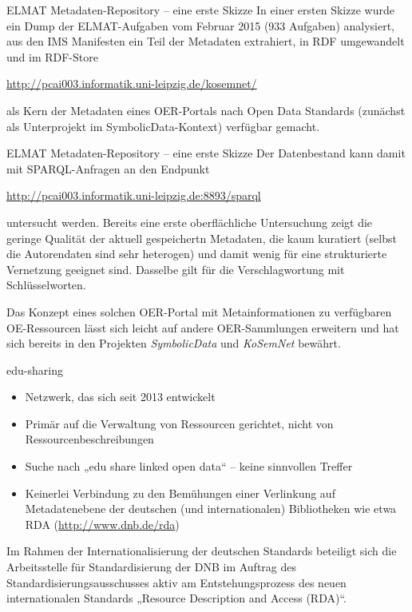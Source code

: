 \documentclass{beamer}
\begin{document}
\begin{frame}{ELMAT Metadaten-Repository -- eine erste Skizze}
In einer ersten Skizze wurde ein Dump der ELMAT-Aufgaben vom Februar 2015 (933
Aufgaben) analysiert, aus den IMS Manifesten ein Teil der Metadaten extrahiert,
in RDF umgewandelt und im RDF-Store 
\begin{center}
  \url{http://pcai003.informatik.uni-leipzig.de/kosemnet/} 
\end{center}
als Kern der Metadaten eines OER-Portals nach Open Data Standards (zunächst als
Unterprojekt im SymbolicData-Kontext) verfügbar gemacht.
\end{frame}

\begin{frame}{ELMAT Metadaten-Repository -- eine erste Skizze}
Der Datenbestand kann damit mit SPARQL-Anfragen an den Endpunkt 
\begin{center}
  \url{http://pcai003.informatik.uni-leipzig.de:8893/sparql}
\end{center}
untersucht werden. Bereits eine erste oberflächliche Untersuchung zeigt die
geringe Qualität der aktuell gespeichertn Metadaten, die kaum kuratiert (selbst
die Autorendaten sind sehr heterogen) und damit wenig für eine strukturierte
Vernetzung geeignet sind. Dasselbe gilt für die Verschlagwortung mit
Schlüsselworten.

Das Konzept eines solchen OER-Portal mit Metainformationen zu verfügbaren
OE-Ressourcen lässt sich leicht auf andere OER-Sammlungen erweitern und hat
sich bereits in den Projekten \emph{SymbolicData} und \emph{KoSemNet} bewährt. 
\end{frame}

\begin{frame}{edu-sharing}
  \begin{itemize}
  \item Netzwerk, das sich seit 2013 entwickelt
  \item Primär auf die Verwaltung von Ressourcen gerichtet, nicht von
    Ressourcenbeschreibungen 
  \item Suche nach „edu share linked open data“ -- keine sinnvollen Treffer 
  \item Keinerlei Verbindung zu den Bemühungen einer Verlinkung auf
    Metadatenebene der deutschen (und internationalen) Bibliotheken wie etwa
    RDA (\url{http://www.dnb.de/rda})
  \end{itemize}

  Im Rahmen der Internationalisierung der deutschen Standards beteiligt sich
  die Arbeitsstelle für Standardisierung der DNB im Auftrag des
  Standardisierungsausschusses aktiv am Entstehungsprozess des neuen
  internationalen Standards „Resource Description and Access (RDA)“.
\end{frame}
\end{document}
